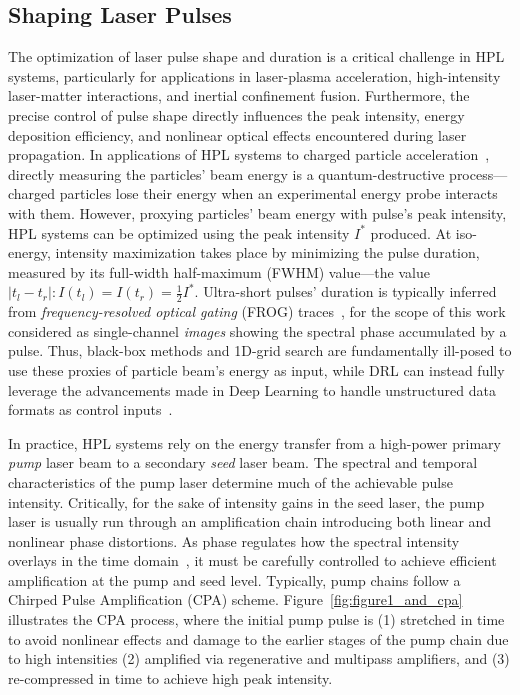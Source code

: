 \subsection{Shaping Laser Pulses}
The optimization of laser pulse shape and duration is a critical challenge in HPL systems, particularly for applications in laser-plasma acceleration, high-intensity laser-matter interactions, and inertial confinement fusion. 
Furthermore, the precise control of pulse shape directly influences the peak intensity, energy deposition efficiency, and nonlinear optical effects encountered during laser propagation. In applications of HPL systems to charged particle acceleration~\citep{grittani2020device}, directly measuring the particles' beam energy is a quantum-destructive process---charged particles lose their energy when an experimental energy probe interacts with them.
However, proxying particles' beam energy with pulse's peak intensity, HPL systems can be optimized using the peak intensity $I^*$ produced. 
At iso-energy, intensity maximization takes place by minimizing the pulse duration, measured by its full-width half-maximum (FWHM) value---the value $\vert t_l - t_r \vert: I(t_l)=I(t_r)= \frac 12 I^*$. Ultra-short pulses' duration is typically inferred from \emph{frequency-resolved optical gating} (FROG) traces~\citep{trebino1993using}, for the scope of this work considered as single-channel \textit{images} showing the spectral phase accumulated by a pulse. 
Thus, black-box methods and 1D-grid search are fundamentally ill-posed to use these proxies of particle beam's energy as input, while DRL can instead fully leverage the advancements made in Deep Learning to handle unstructured data formats as control inputs~\citep{mnih2013playing}.

In practice, HPL systems rely on the energy transfer from a high-power primary \textit{pump} laser beam to a secondary \textit{seed} laser beam. The spectral and temporal characteristics of the pump laser determine much of the achievable pulse intensity. Critically, for the sake of intensity gains in the seed laser, the pump laser is usually run through an amplification chain introducing both linear and nonlinear phase distortions. As phase regulates how the spectral intensity overlays in the time domain~\citep{paschotta2008field}, it must be carefully controlled to achieve efficient amplification at the pump and seed level. 
Typically, pump chains follow a Chirped Pulse Amplification (CPA) scheme. Figure~\ref{fig:figure1_and_cpa} illustrates the CPA process, where the initial pump pulse is (1) stretched in time to avoid nonlinear effects and damage to the earlier stages of the pump chain due to high intensities (2) amplified via regenerative and multipass amplifiers, and (3) re-compressed in time to achieve high peak intensity.

